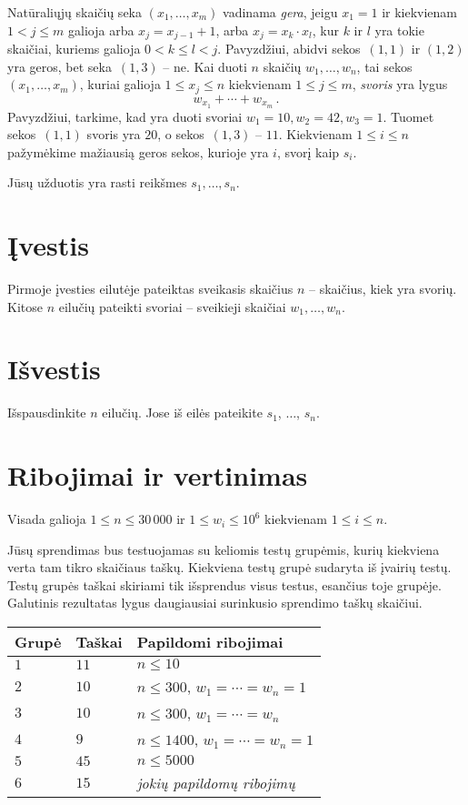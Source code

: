 
\noindent
Natūraliųjų skaičių seka $(x_1,\ldots,x_m)$ vadinama \emph{gera}, jeigu  $x_1 = 1$ ir kiekvienam $1 < j \leq m$ galioja arba $x_j=x_{j-1}+1$, arba $x_j=x_k\cdot x_l$, kur $k$ ir $l$ yra tokie skaičiai, kuriems galioja $0< k\leq l< j$.
Pavyzdžiui, abidvi sekos~$(1,1)$ ir $(1,2)$ yra geros, bet seka~$(1,3)$ -- ne.
Kai duoti $n$ skaičių $w_1,\ldots,w_n$, tai sekos $(x_1,\ldots,x_m)$, kuriai galioja $1\leq x_j \leq n$ kiekvienam $1\leq j\leq m$,
\emph{svoris} yra lygus
\[ w_{x_1} +\cdots +w_{x_m}\,.\] 
Pavyzdžiui, tarkime, kad yra duoti svoriai $w_1=10,  w_2=42,w_3= 1$. Tuomet sekos~$(1,1)$ svoris yra $20$, o sekos~$(1,3)$ -- $11$.
Kiekvienam $1\leq i\leq n$ pažymėkime mažiausią geros sekos, kurioje yra $i$, svorį kaip $s_i$.

Jūsų užduotis yra rasti reikšmes $s_1,\ldots ,s_n$.

\section*{Įvestis}

Pirmoje įvesties eilutėje pateiktas sveikasis skaičius $n$ -- skaičius, kiek yra svorių.
Kitose $n$ eilučių pateikti svoriai -- sveikieji skaičiai $w_1, \ldots, w_n$.

\section*{Išvestis}

Išspausdinkite $n$ eilučių. Jose iš eilės pateikite $s_1$, $\ldots$, $s_n$.

\section*{Ribojimai ir vertinimas}

Visada galioja
$1\leq n \leq 30\,000$ %
ir
$1\leq w_i \leq 10^6$ kiekvienam $1\leq i \leq n$.%

Jūsų sprendimas bus testuojamas su keliomis testų grupėmis, kurių kiekviena verta tam tikro skaičiaus taškų.
Kiekviena testų grupė sudaryta iš įvairių testų.
Testų grupės taškai skiriami tik išsprendus visus testus, esančius toje grupėje.
Galutinis rezultatas lygus daugiausiai surinkusio sprendimo taškų skaičiui.

\medskip
\begin{tabular}{lll}
Grupė & Taškai & Papildomi ribojimai \\\hline
$1$   & $11$ & $n\leq 10$ \\
$2$   & $10$ & $n\leq 300$, $w_1=\cdots=w_n = 1$ \\
$3$   & $10$ & $n\leq 300$, $w_1=\cdots=w_n$ \\ %
$4$   & $9$ & $n\leq 1400$, $w_1=\cdots=w_n = 1$ \\
$5$   & $45$ & $n\leq 5000$\\
$6$   & $15$ & \emph{jokių papildomų ribojimų}
\end{tabular}
